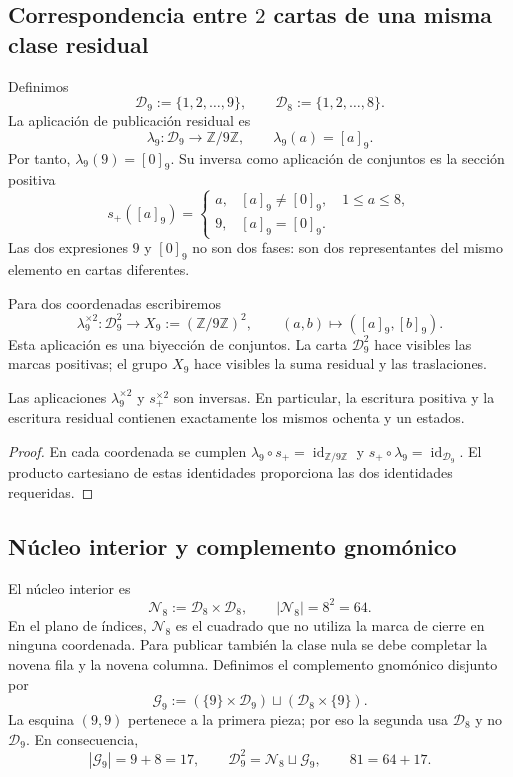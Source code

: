 \subsection{Correspondencia entre \(2\) cartas de una misma clase residual}

Definimos
\[
 \mathcal D_9:=\{1,2,\ldots,9\},
 \qquad
 \mathcal D_8:=\{1,2,\ldots,8\}.
\]
La aplicación de publicación residual es
\[
 \lambda_9:\mathcal D_9\longrightarrow\mathbb Z/9\mathbb Z,
 \qquad
 \lambda_9(a)=[a]_9.
\]
Por tanto, \(\lambda_9(9)=[0]_9\). Su inversa como aplicación de
conjuntos es la sección positiva
\[
 s_+([a]_9)=
 \begin{cases}
  a,&[a]_9\neq[0]_9,\quad 1\leq a\leq8,\\
  9,&[a]_9=[0]_9.
 \end{cases}
\]
Las dos expresiones \(9\) y \([0]_9\) no son dos fases: son dos
representantes del mismo elemento en cartas diferentes.

Para dos coordenadas escribiremos
\[
 \lambda_9^{\times2}:\mathcal D_9^2
       \longrightarrow X_9:=(\mathbb Z/9\mathbb Z)^2,
 \qquad
 (a,b)\longmapsto([a]_9,[b]_9).
\]
Esta aplicación es una biyección de conjuntos. La carta
\(\mathcal D_9^2\) hace visibles las marcas positivas; el grupo \(X_9\)
hace visibles la suma residual y las traslaciones.

\begin{lemma}
\label{p12-83-c1-s2:lem:app-cambio-carta-sin-perdida}
Las aplicaciones \(\lambda_9^{\times2}\) y
\(s_+^{\times2}\) son inversas. En particular, la escritura positiva y la
escritura residual contienen exactamente los mismos ochenta y un estados.
\end{lemma}

\begin{proof}
En cada coordenada se cumplen
\(\lambda_9\circ s_+=\operatorname{id}_{\mathbb Z/9\mathbb Z}\) y
\(s_+\circ\lambda_9=\operatorname{id}_{\mathcal D_9}\). El producto
cartesiano de estas identidades proporciona las dos identidades requeridas.
\end{proof}

\subsection{Núcleo interior y complemento gnomónico}

El núcleo interior es
\[
 \mathcal N_8:=\mathcal D_8\times\mathcal D_8,
 \qquad |\mathcal N_8|=8^2=64.
\]
En el plano de índices, \(\mathcal N_8\) es el cuadrado que no utiliza la
marca de cierre en ninguna coordenada. Para publicar también la clase nula
se debe completar la novena fila y la novena columna. Definimos el
complemento gnomónico disjunto por
\[
 \mathcal G_9:=
  (\{9\}\times\mathcal D_9)
  \sqcup
  (\mathcal D_8\times\{9\}).
\]
La esquina \((9,9)\) pertenece a la primera pieza; por eso la segunda usa
\(\mathcal D_8\) y no \(\mathcal D_9\). En consecuencia,
\[
 |\mathcal G_9|=9+8=17,
 \qquad
 \mathcal D_9^2=\mathcal N_8\sqcup\mathcal G_9,
 \qquad
 81=64+17.
\]


